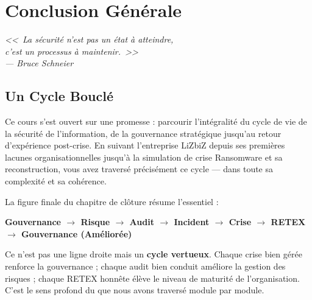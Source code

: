 
\chapter*{Conclusion Générale}

\begin{flushright}
    \itshape
    <<~La sécurité n'est pas un état à atteindre,\\
    c'est un processus à maintenir.~>>\\[0.5ex]
    \small--- Bruce Schneier
\end{flushright}

\vspace{1.5ex}

\section*{Un Cycle Bouclé}

Ce cours s'est ouvert sur une promesse : parcourir l'intégralité du cycle de vie de la sécurité de l'information, de la gouvernance stratégique jusqu'au retour d'expérience post-crise. En suivant l'entreprise LiZbiZ depuis ses premières lacunes organisationnelles jusqu'à la simulation de crise Ransomware et sa reconstruction, vous avez traversé précisément ce cycle — dans toute sa complexité et sa cohérence.

La figure finale du chapitre de clôture résume l'essentiel :

\begin{center}
\large\bfseries\color{CouleurPrimaire}
Gouvernance $\rightarrow$ Risque $\rightarrow$ Audit $\rightarrow$ Incident $\rightarrow$ Crise $\rightarrow$ RETEX $\rightarrow$ Gouvernance (Améliorée)
\end{center}

\medskip
Ce n'est pas une ligne droite mais un \textbf{cycle vertueux}. Chaque crise bien gérée renforce la gouvernance ; chaque audit bien conduit améliore la gestion des risques ; chaque RETEX honnête élève le niveau de maturité de l'organisation. C'est le sens profond du  que nous avons traversé module par module.

